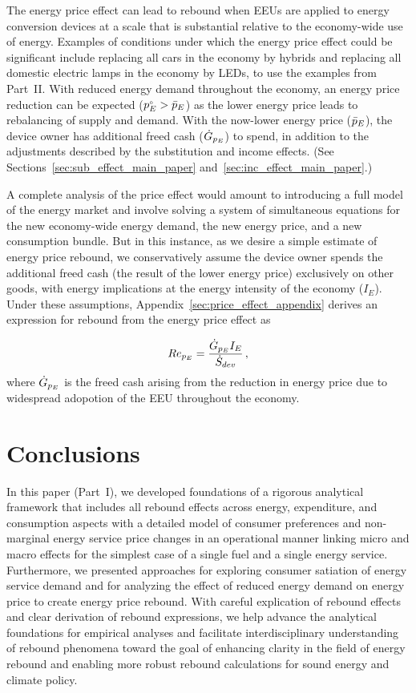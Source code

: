\documentclass[12pt]{article}\usepackage[]{graphicx}\usepackage[]{xcolor}
\begin{document}
The energy price effect can lead to rebound when
EEUs are applied to energy conversion devices 
at a scale that is substantial relative to the economy-wide
use of energy.
Examples of conditions under which the energy price effect 
could be significant include 
replacing all cars in the economy by hybrids and 
replacing all domestic electric lamps in the economy by LEDs, 
to use the examples from Part~II.
With reduced energy demand throughout the economy, 
an energy price reduction can be expected
(${}{p}^{\scriptscriptstyle \circ}_E > \bar{p}_E$)
as the lower energy price leads to rebalancing of supply and demand.
With the now-lower energy price ($\bar{p}_E$), 
the device owner has additional freed cash ($\dot{G}_{p_E}$)
to spend,
in addition to the adjustments described by 
the substitution and income effects.
(See Sections~\ref{sec:sub_effect_main_paper}
and~\ref{sec:inc_effect_main_paper}.)

A complete analysis of the price effect
would amount to introducing a full model
of the energy market and involve solving a system 
of simultaneous equations for 
the new economy-wide energy demand,
the new energy price, and
a new consumption bundle. 
But in this instance, 
as we desire a simple estimate
of energy price rebound,
we conservatively assume the device owner spends 
the additional freed cash
(the result of the lower energy price)
exclusively on other goods,
with energy implications 
at the energy intensity of the economy ($I_E$).
Under these assumptions,
Appendix~\ref{sec:price_effect_appendix} derives an expression for 
rebound from the energy price effect as

\begin{equation} \label{eq:Re_p_E}
  Re_{p_E} = \frac{\dot{G}_{p_E} I_E}{\dot{S}_{dev}} \, ,
\end{equation}
%
where $\dot{G}_{p_E}$ is the freed cash arising from 
the reduction in energy price due to 
widespread adopotion of the EEU throughout the economy.


\section{Conclusions}
\label{sec:conclusion}

In this paper (Part~I),
we developed foundations 
of a rigorous analytical framework that
includes all rebound effects
across energy, expenditure, and consumption aspects with 
a detailed model of consumer preferences and
non-marginal energy service price changes
in an operational manner
linking micro and macro effects
for the 
simplest case of a single fuel and a single energy service.
Furthermore, we presented approaches
for exploring consumer satiation of energy service demand and
for analyzing the effect of reduced energy demand on energy price 
to create energy price rebound.
With careful explication of rebound effects and 
clear derivation of rebound expressions,
we help advance the analytical foundations for empirical analyses and
facilitate interdisciplinary understanding of rebound phenomena
toward the goal of enhancing clarity in the field of energy rebound and
enabling more robust rebound calculations
for sound energy and climate policy.
\end{document}
